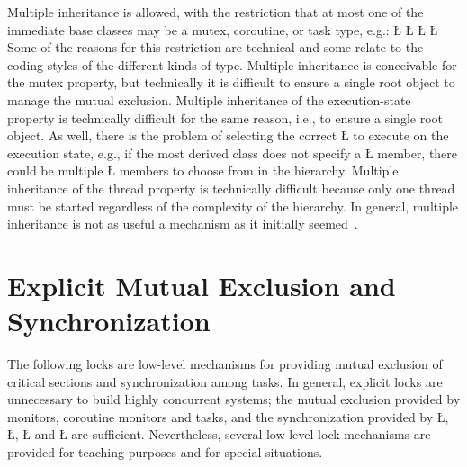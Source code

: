 \documentclass[openright,twoside]{report}
\begin{document}
Multiple inheritance is allowed, with the restriction that at most one of the immediate base classes may be a mutex, coroutine, or task type, e.g.:
\LGinlinefalse\LGbegin\lgrinde
\L{}
\L{}
\L{}
\L{}
\endlgrinde\LGend
Some of the reasons for this restriction are technical and some relate to the coding styles of the different kinds of type.
Multiple inheritance is conceivable for the mutex property, but technically it is difficult to ensure a single root object to manage the mutual exclusion.
Multiple inheritance of the execution-state property is technically difficult for the same reason, i.e., to ensure a single root object.
As well, there is the problem of selecting the correct \LGinlinetrue\LGbegin\lgrinde\L{}\endlgrinde\LGend{} to execute on the execution state, e.g., if the most derived class does not specify a \LGinlinetrue\LGbegin\lgrinde\L{}\endlgrinde\LGend{} member, there could be multiple \LGinlinetrue\LGbegin\lgrinde\L{}\endlgrinde\LGend{} members to choose from in the hierarchy.
Multiple inheritance of the thread property is technically difficult because only one thread must be started regardless of the complexity of the hierarchy.
In general, multiple inheritance is not as useful a mechanism as it initially seemed~\cite{Cargill90}.


\section{Explicit Mutual Exclusion and Synchronization}

The following locks are low-level mechanisms for providing mutual exclusion of critical sections and synchronization among tasks.
In general, explicit locks are unnecessary to build highly concurrent systems;
the mutual exclusion provided by monitors, coroutine monitors and tasks, and the synchronization provided by \LGinlinetrue\LGbegin\lgrinde\L{}\endlgrinde\LGend{}, \LGinlinetrue\LGbegin\lgrinde\L{}\endlgrinde\LGend{}, \LGinlinetrue\LGbegin\lgrinde\L{}\endlgrinde\LGend{} and \LGinlinetrue\LGbegin\lgrinde\L{}\endlgrinde\LGend{} are sufficient.
Nevertheless, several low-level lock mechanisms are provided for teaching purposes and for special situations.
\end{document}
